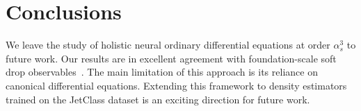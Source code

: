 \section{Conclusions}\label{sec:conclusions}

We leave the study of holistic neural ordinary differential equations at
order $\alpha_s^3$ to future work. Our results are in excellent
agreement with foundation-scale soft drop
observables~\cite{TPC:0237-Towards-AGI-for-Jet-Calibration-September-29-2026}.
The main limitation of this approach is its reliance on canonical
differential equations. Extending this framework to density estimators
trained on the JetClass dataset is an exciting direction for future
work.

